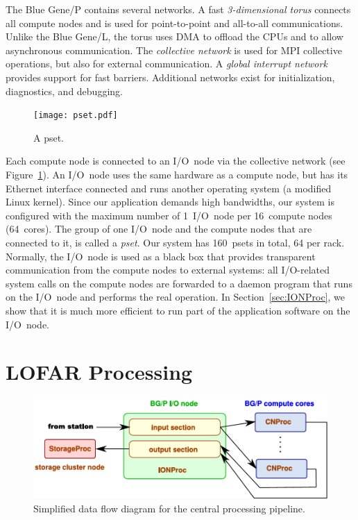 \documentclass{sig-alternate}
\begin{document}
The Blue Gene/P contains several networks.
A fast \emph{3-dimensional torus\/} connects all compute nodes and is used
for point-to-point and all-to-all communications.
Unlike the Blue Gene/L, the torus uses DMA to offload the CPUs and to allow
asynchronous communication.
The \emph{collective network\/} is used for MPI collective operations,
but also for external communication.
A \emph{global interrupt network\/} provides support for fast barriers.
Additional networks exist for initialization, diagnostics, and debugging.

\begin{figure}[ht]
\texttt{[image: pset.pdf]}
\caption{A pset.}
\label{fig:pset}
\end{figure}

Each compute node is connected to an I/O~node via the collective network
(see Figure~\ref{fig:pset}).
An I/O~node uses the same hardware as a compute node, but has its Ethernet
interface connected and runs another operating system (a modified Linux kernel).
Since our application demands high bandwidths, our system is configured with
the maximum number of 1~I/O~node per 16~compute nodes (64~cores).
The group of one I/O~node and the compute nodes that are connected to it,
is called a \emph{pset}.
Our system has 160~psets in total, 64 per rack.
Normally, the I/O~node is used as a black box that provides transparent
communication from the compute nodes to external systems: all I/O-related
system calls on the compute nodes are forwarded to a daemon program that runs
on the I/O~node and performs the real operation.
In Section~\ref{sec:IONProc}, we show that it is much more
efficient to run part of the application software on the I/O~node.


\section{LOFAR Processing}
\label{sec:processing}

\begin{figure}[ht]
\includegraphics[width=\columnwidth]{processing-overview.pdf}
\caption{Simplified data flow diagram for the central processing pipeline.}
\label{fig:processing}
\end{figure}
\end{document}
